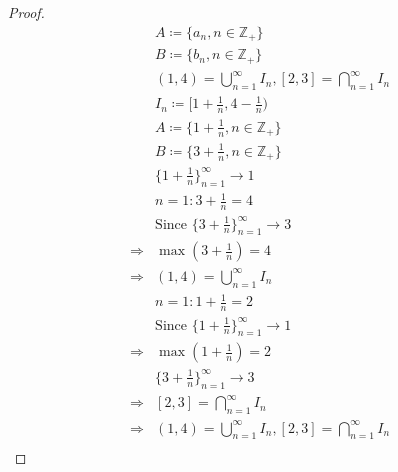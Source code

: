 \documentclass{article}
\begin{document}
\begin{proof}
    \begin{align*}
        &A\coloneqq\{a_n,n\in\mathbb{Z} _+\}\\
        &B\coloneqq\{b_n,n\in\mathbb{Z} _+\}\\
        &(1,4)=\bigcup_{n=1}^{\infty}I_n,[2,3]=\bigcap_{n=1}^{\infty}I_n\\
        &I_n\coloneqq[1+\frac{1}{n},4-\frac{1}{n})\\
        &A\coloneqq\{1+\frac{1}{n},n\in\mathbb{Z} _+\}\\
        &B\coloneqq\{3+\frac{1}{n},n\in\mathbb{Z} _+\}\\
        &\{1+\frac{1}{n}\}^\infty_{n=1}\rightarrow1\\
        &n=1:3+\frac{1}{n}=4\\
        &\text{Since }\{3+\frac{1}{n}\}^\infty_{n=1}\rightarrow3\\
        \Rightarrow&\max (3+\frac{1}{n})=4\\
        \Rightarrow&(1,4)=\bigcup_{n=1}^{\infty}I_n\\
        &n=1:1+\frac{1}{n}=2\\
        &\text{Since }\{1+\frac{1}{n}\}^\infty_{n=1}\rightarrow1\\
        \Rightarrow&\max (1+\frac{1}{n})=2\\
        &\{3+\frac{1}{n}\}^\infty_{n=1}\rightarrow3\\
        \Rightarrow&[2,3]=\bigcap_{n=1}^{\infty}I_n\\
        \Rightarrow&(1,4)=\bigcup_{n=1}^{\infty}I_n,[2,3]=\bigcap_{n=1}^{\infty}I_n\\
    \end{align*}
\end{proof}
\end{document}
